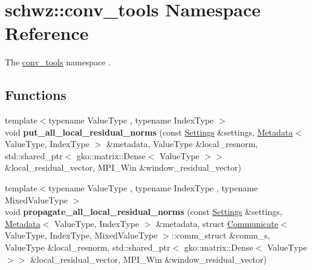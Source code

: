 \hypertarget{namespaceschwz_1_1conv__tools}{}\section{schwz\+:\+:conv\+\_\+tools Namespace Reference}
\label{namespaceschwz_1_1conv__tools}


The \hyperlink{namespaceschwz_1_1conv__tools}{conv\+\_\+tools} namespace .  


\subsection*{Functions}
\begin{DoxyCompactItemize}
\item 
\mbox{\label{namespaceschwz_1_1conv__tools_a36a12a05164af19e0faec5403fd3cfce}} 
{\footnotesize template$<$typename Value\+Type , typename Index\+Type $>$ }\\void {\bfseries put\+\_\+all\+\_\+local\+\_\+residual\+\_\+norms} (const \hyperlink{structschwz_1_1Settings}{Settings} \&settings, \hyperlink{structschwz_1_1Metadata}{Metadata}$<$ Value\+Type, Index\+Type $>$ \&metadata, Value\+Type \&local\+\_\+resnorm, std\+::shared\+\_\+ptr$<$ gko\+::matrix\+::\+Dense$<$ Value\+Type $>$$>$ \&local\+\_\+residual\+\_\+vector, M\+P\+I\+\_\+\+Win \&window\+\_\+residual\+\_\+vector)
\item 
\mbox{\label{namespaceschwz_1_1conv__tools_a244455332c6025d8282546456f606ba1}} 
{\footnotesize template$<$typename Value\+Type , typename Index\+Type , typename Mixed\+Value\+Type $>$ }\\void {\bfseries propagate\+\_\+all\+\_\+local\+\_\+residual\+\_\+norms} (const \hyperlink{structschwz_1_1Settings}{Settings} \&settings, \hyperlink{structschwz_1_1Metadata}{Metadata}$<$ Value\+Type, Index\+Type $>$ \&metadata, struct \hyperlink{classschwz_1_1Communicate}{Communicate}$<$ Value\+Type, Index\+Type, Mixed\+Value\+Type $>$\+::comm\+\_\+struct \&comm\+\_\+s, Value\+Type \&local\+\_\+resnorm, std\+::shared\+\_\+ptr$<$ gko\+::matrix\+::\+Dense$<$ Value\+Type $>$$>$ \&local\+\_\+residual\+\_\+vector, M\+P\+I\+\_\+\+Win \&window\+\_\+residual\+\_\+vector)
\item 
\mbox{\label{namespaceschwz_1_1conv__tools_ad2a454563a99665373863676ab9c0a72}} 

\end{DoxyCompactItemize}
